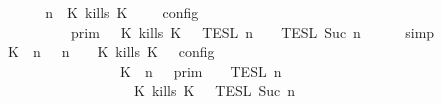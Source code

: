 \begin{isabellebody}
%
\isadelimproof
%
\endisadelimproof
%
\isatagproof
{}\isamarkupfalse%
\ {\isacharminus}\isanewline
\ \ \isamarkupfalse%
\ {\isacartoucheopen}{\isasymlbrakk}\ {\isasymGamma}{\isacharcomma}\ n\ {\isasymturnstile}\ {\isacharparenleft}{\isacharparenleft}K\ kills\ K\ {\isacharhash}\ {\isasymPsi}{\isacharparenright}\ {\isasymtriangleright}\ {\isasymPhi}\ {\isasymrbrakk}\isactrlsub c\isactrlsub o\isactrlsub n\isactrlsub f\isactrlsub i\isactrlsub g\isanewline
\ \ \ \ \ \ \ \ {\isacharequal}\ {\isasymlbrakk}{\isasymlbrakk}\ {\isasymGamma}\ {\isasymrbrakk}{\isasymrbrakk}\isactrlsub p\isactrlsub r\isactrlsub i\isactrlsub m\ {\isasyminter}\ {\isasymlbrakk}{\isasymlbrakk}\ {\isacharparenleft}K\ kills\ K\ {\isacharhash}\ {\isasymPsi}\ {\isasymrbrakk}{\isasymrbrakk}\isactrlsub T\isactrlsub E\isactrlsub S\isactrlsub L\isactrlbsup {\isasymge}\ n\isactrlesup \ {\isasyminter}\ {\isasymlbrakk}{\isasymlbrakk}\ {\isasymPhi}\ {\isasymrbrakk}{\isasymrbrakk}\isactrlsub T\isactrlsub E\isactrlsub S\isactrlsub L\isactrlbsup {\isasymge}\ Suc\ n\isactrlesup {\isacartoucheclose}\isanewline
\ \ \ \ \isamarkupfalse%
\ simp\isanewline
\ \ \isamarkupfalse%
\ \isamarkupfalse%
\ {\isacartoucheopen}{\isasymlbrakk}\ {\isacharparenleft}{\isacharparenleft}K\ {\isasymnot}{\isasymUp}\ n{\isacharparenright}\ {\isacharhash}\ {\isasymGamma}{\isacharparenright}{\isacharcomma}\ n\ {\isasymturnstile}\ {\isasymPsi}\ {\isasymtriangleright}\ {\isacharparenleft}{\isacharparenleft}K\ kills\ K\ {\isacharhash}\ {\isasymPhi}{\isacharparenright}\ {\isasymrbrakk}\isactrlsub c\isactrlsub o\isactrlsub n\isactrlsub f\isactrlsub i\isactrlsub g\isanewline
\ \ \ \ \ \ \ \ \ \ \ \ \ \ \ \ {\isacharequal}\ {\isasymlbrakk}{\isasymlbrakk}\ {\isacharparenleft}K\ {\isasymnot}{\isasymUp}\ n{\isacharparenright}\ {\isacharhash}\ {\isasymGamma}\ {\isasymrbrakk}{\isasymrbrakk}\isactrlsub p\isactrlsub r\isactrlsub i\isactrlsub m\ {\isasyminter}\ {\isasymlbrakk}{\isasymlbrakk}\ {\isasymPsi}\ {\isasymrbrakk}{\isasymrbrakk}\isactrlsub T\isactrlsub E\isactrlsub S\isactrlsub L\isactrlbsup {\isasymge}\ n\isactrlesup \isanewline
\ \ \ \ \ \ \ \ \ \ \ \ \ \ \ \ \ \ {\isasyminter}\ {\isasymlbrakk}{\isasymlbrakk}\ {\isacharparenleft}K\ kills\ K\ {\isacharhash}\ {\isasymPhi}\ {\isasymrbrakk}{\isasymrbrakk}\isactrlsub T\isactrlsub E\isactrlsub S\isactrlsub L\isactrlbsup {\isasymge}\ Suc\ n\isactrlesup {\isacartoucheclose}\ \isamarkupfalse%

\end{isabellebody}
